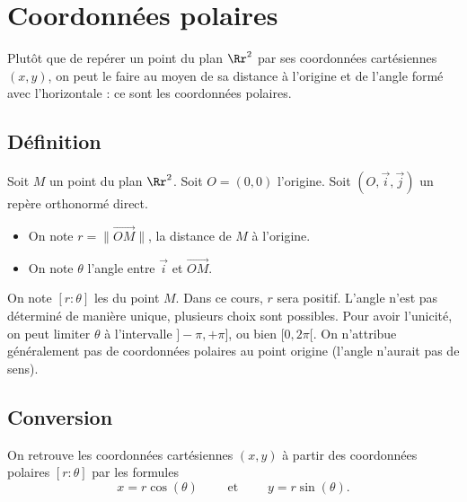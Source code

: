 \documentclass[11pt,class=report,crop=false]{standalone}
\begin{document}
\section{Coordonnées polaires}


Plutôt que de repérer un point du plan $\Rr^2$ par ses coordonnées cartésiennes $(x,y)$, on peut le faire au moyen de sa distance à l'origine et de l'angle formé avec l'horizontale : ce sont les coordonnées polaires.


\subsection{Définition}

Soit $M$ un point du plan $\Rr^2$. Soit $O=(0,0)$ l'origine. Soit $(O, \vec i, \vec j)$ un repère orthonormé direct.

\begin{itemize}
	\item On note $r = \| \overrightarrow{OM} \|$, la distance de $M$ à l'origine.
	\item On note $\theta$ l'angle entre $\vec i$ et $\overrightarrow{OM}$.
\end{itemize}


On note $[r:\theta]$ les  du point $M$. Dans ce cours, $r$ sera positif.
L'angle n'est pas déterminé de manière unique, plusieurs choix sont possibles. Pour avoir l'unicité, on peut limiter $\theta$ à l'intervalle $]-\pi,+\pi]$, ou bien $[0,2\pi[$. On n'attribue généralement pas de coordonnées polaires au point origine (l'angle n'aurait pas de sens). 


\subsection{Conversion}

\bigskip
{}

On retrouve les coordonnées cartésiennes $(x,y)$ à partir des coordonnées polaires $[r:\theta]$ par les formules
$$x = r\cos(\theta) \qquad\text{ et }\qquad y = r \sin(\theta).$$


\bigskip
{}
\end{document}
